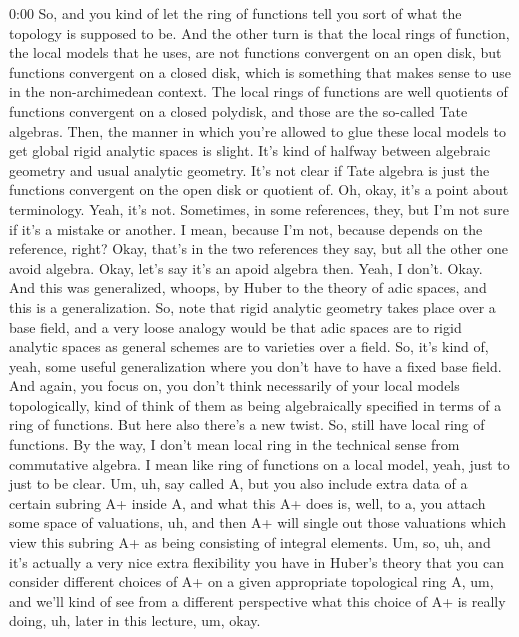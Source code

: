 \begin{unfinished}{0:00}
So, and you kind of let the ring of functions tell you sort of what the topology is supposed to be. And the other turn is that the local rings of function, the local models that he uses, are not functions convergent on an open disk, but functions convergent on a closed disk, which is something that makes sense to use in the non-archimedean context. The local rings of functions are well quotients of functions convergent on a closed polydisk, and those are the so-called Tate algebras. Then, the manner in which you're allowed to glue these local models to get global rigid analytic spaces is slight. It's kind of halfway between algebraic geometry and usual analytic geometry. It's not clear if Tate algebra is just the functions convergent on the open disk or quotient of. Oh, okay, it's a point about terminology. Yeah, it's not. Sometimes, in some references, they, but I'm not sure if it's a mistake or another. I mean, because I'm not, because depends on the reference, right? Okay, that's in the two references they say, but all the other one avoid algebra. Okay, let's say it's an apoid algebra then. Yeah, I don't. Okay. And this was generalized, whoops, by Huber to the theory of adic spaces, and this is a generalization. So, note that rigid analytic geometry takes place over a base field, and a very loose analogy would be that adic spaces are to rigid analytic spaces as general schemes are to varieties over a field. So, it's kind of, yeah, some useful generalization where you don't have to have a fixed base field. And again, you focus on, you don't think necessarily of your local models topologically, kind of think of them as being algebraically specified in terms of a ring of functions. But here also there's a new twist. So, still have local ring of functions. By the way, I don't mean local ring in the technical sense from commutative algebra. I mean like ring of functions on a local model, yeah, just to just to be clear. Um, uh, say called A, but you also include extra data of a certain subring A+ inside A, and what this A+ does is, well, to a, you attach some space of valuations, uh, and then A+ will single out those valuations which view this subring A+ as being consisting of integral elements. Um, so, uh, and it's actually a very nice extra flexibility you have in Huber's theory that you can consider different choices of A+ on a given appropriate topological ring A, um, and we'll kind of see from a different perspective what this choice of A+ is really doing, uh, later in this lecture, um, okay.


\end{unfinished}
